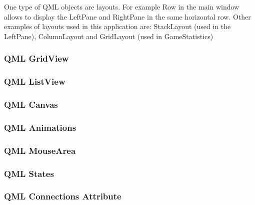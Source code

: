 One type of QML objects are layouts. For example Row in the main window allows to display the LeftPane and RightPane in the same horizontal row. Other examples of layouts used in this application are: StackLayout (used in the LeftPane), ColumnLayout and GridLayout (used in GameStatistics)

\subsubsection {QML GridView}

\subsubsection {QML ListView}

\subsubsection {QML Canvas}

\subsubsection {QML Animations}

\subsubsection {QML MouseArea}

\subsubsection {QML States}

\subsubsection {QML Connections Attribute}